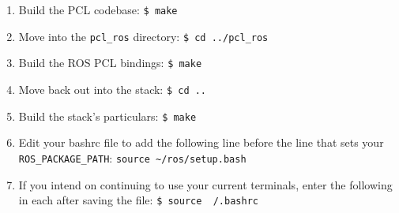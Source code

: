 \documentclass[12pt]{report}
\begin{document}
\begin{enumerate}
\item{Build the PCL codebase: \texttt{\$\ make}}
\item{Move into the \texttt{pcl\_ros} directory: \texttt{\$\ cd ../pcl\_ros}}
\item{Build the ROS PCL bindings: \texttt{\$\ make}}
\item{Move back out into the stack: \texttt{\$\ cd ..}}
\item{Build the stack's particulars: \texttt{\$\ make}}
\item{Edit your bashrc file to add the following line before the line that sets your \texttt{ROS\_PACKAGE\_PATH}: \texttt{source \~{}/ros/setup.bash}}
\item{If you intend on continuing to use your current terminals, enter the following in each after saving the file: \texttt{\$\ source ~{}/.bashrc}}
\end{enumerate}
\end{document}
